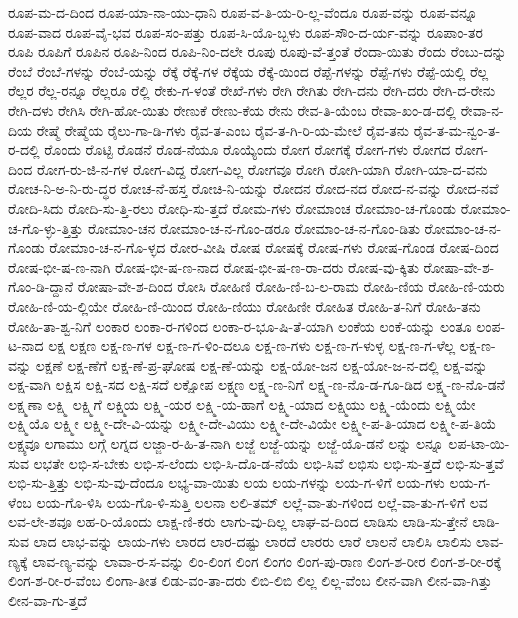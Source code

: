 {ರೂಪ-ಮ-ದ-ದಿಂದ
ರೂಪ-ಯಾ-ನಾ-ಯು-ಧಾನಿ
ರೂಪ-ವ-ತಿ-ಯ-ರಿ-ಲ್ಲ-ವೆಂದೂ
ರೂಪ-ವನ್ನು
ರೂಪ-ವನ್ನೂ
ರೂಪ-ವಾದ
ರೂಪ-ವೈ-ಭವ
ರೂಪ-ಸಂ-ಪತ್ತು
ರೂಪ-ಸಿ-ಯೊ-ಬ್ಬಳು
ರೂಪ-ಸೌಂ-ದ-ರ್ಯ-ವನ್ನು
ರೂಪಾಂ-ತರ
ರೂಪಿ
ರೂಪಿಗೆ
ರೂಪಿನ
ರೂಪಿ-ನಿಂದ
ರೂಪಿ-ನಿಂ-ದಲೇ
ರೂಪು
ರೂಪು-ವೆ-ತ್ತಂತೆ
ರೆಂದಾ-ಯಿತು
ರೆಂದು
ರೆಂಬು-ದನ್ನು
ರೆಂಬೆ
ರೆಂಬೆ-ಗಳನ್ನು
ರೆಂಬೆ-ಯನ್ನು
ರೆಕ್ಕೆ
ರೆಕ್ಕೆ-ಗಳ
ರೆಕ್ಕೆಯ
ರೆಕ್ಕೆ-ಯಿಂದ
ರೆಪ್ಪೆ-ಗಳನ್ನು
ರೆಪ್ಪೆ-ಗಳು
ರೆಪ್ಪೆ-ಯಲ್ಲಿ
ರೆಲ್ಲ
ರೆಲ್ಲರ
ರೆಲ್ಲ-ರನ್ನೂ
ರೆಲ್ಲರೂ
ರೆಲ್ಲಿ
ರೇಕು-ಗ-ಳಂತೆ
ರೇಖೆ-ಗಳು
ರೇಗಿ
ರೇಗಿತು
ರೇಗಿ-ದನು
ರೇಗಿ-ದರು
ರೇಗಿ-ದ-ರೇನು
ರೇಗಿ-ದಳು
ರೇಗಿಸಿ
ರೇಗಿ-ಹೋ-ಯಿತು
ರೇಣುಕೆ
ರೇಣು-ಕೆಯ
ರೇನು
ರೇವ-ತಿ-ಯೆಂಬ
ರೇವಾ-ಖಂ-ಡ-ದಲ್ಲಿ
ರೇವಾ-ನ-ದಿಯ
ರೇಷ್ಮೆ
ರೇಷ್ಮೆಯ
ರೈಲು-ಗಾ-ಡಿ-ಗಳು
ರೈವ-ತ-ಎಂಬ
ರೈವ-ತ-ಗಿ-ರಿ-ಯ-ಮೇಲೆ
ರೈವ-ತನು
ರೈವ-ತ-ಮ-ನ್ವಂ-ತ-ರ-ದಲ್ಲಿ
ರೊಂದು
ರೊಟ್ಟಿ
ರೊಡನೆ
ರೊಡ-ನೆಯೂ
ರೊಯ್ಯೆಂದು
ರೋಗ
ರೋಗಕ್ಕೆ
ರೋಗ-ಗಳು
ರೋಗದ
ರೋಗ-ದಿಂದ
ರೋಗ-ರು-ಜಿ-ನ-ಗಳ
ರೋಗ-ವಿದ್ದ
ರೋಗ-ವಿಲ್ಲ
ರೋಗವೂ
ರೋಗಿ
ರೋಗಿ-ಯಾಗಿ
ರೋಗಿ-ಯಾ-ದ-ವನು
ರೋಚ-ನಿ-ಅ-ನಿ-ರು-ದ್ಧರ
ರೋಚ-ನೆ-ಹಸ್ತ
ರೋಚಿ-ನಿ-ಯನ್ನು
ರೋದನ
ರೋದ-ನದ
ರೋದ-ನ-ವನ್ನು
ರೋದ-ನವೆ
ರೋದಿ-ಸಿದು
ರೋದಿ-ಸು-ತ್ತಿ-ರಲು
ರೋಧಿ-ಸು-ತ್ತದೆ
ರೋಮ-ಗಳು
ರೋಮಾಂಚ
ರೋಮಾಂ-ಚ-ಗೊಂಡು
ರೋಮಾಂ-ಚ-ಗೊ-ಳ್ಳು-ತ್ತಿತ್ತು
ರೋಮಾಂ-ಚನ
ರೋಮಾಂ-ಚ-ನ-ಗೊಂ-ಡರೂ
ರೋಮಾಂ-ಚ-ನ-ಗೊಂ-ಡಿತು
ರೋಮಾಂ-ಚ-ನ-ಗೊಂಡು
ರೋಮಾಂ-ಚ-ನ-ಗೊ-ಳ್ಳದ
ರೋರ-ವೀಷಿ
ರೋಷ
ರೋಷಕ್ಕೆ
ರೋಷ-ಗಳು
ರೋಷ-ಗೊಂಡ
ರೋಷ-ದಿಂದ
ರೋಷ-ಭೀ-ಷ-ಣ-ನಾಗಿ
ರೋಷ-ಭೀ-ಷ-ಣ-ನಾದ
ರೋಷ-ಭೀ-ಷ-ಣ-ರಾ-ದರು
ರೋಷ-ವು-ಕ್ಕಿತು
ರೋಷಾ-ವೇ-ಶ-ಗೊಂ-ಡಿ-ದ್ದಾನೆ
ರೋಷಾ-ವೇ-ಶ-ದಿಂದ
ರೋಸಿ
ರೋಹಿಣಿ
ರೋಹಿ-ಣಿ-ಬ-ಲ-ರಾಮ
ರೋಹಿ-ಣಿಯ
ರೋಹಿ-ಣಿ-ಯರು
ರೋಹಿ-ಣಿ-ಯ-ಲ್ಲಿಯೇ
ರೋಹಿ-ಣಿ-ಯಿಂದ
ರೋಹಿ-ಣಿಯು
ರೋಹಿಣೀ
ರೋಹಿತ
ರೋಹಿ-ತ-ನಿಗೆ
ರೋಹಿ-ತನು
ರೋಹಿ-ತಾ-ಶ್ವ-ನಿಗೆ
ಲಂಕಾರ
ಲಂಕಾ-ರ-ಗಳಿಂದ
ಲಂಕಾ-ರ-ಭೂ-ಷಿ-ತೆ-ಯಾಗಿ
ಲಂಕೆಯ
ಲಂಕೆ-ಯನ್ನು
ಲಂತೂ
ಲಂಪ-ಟ-ನಾದ
ಲಕ್ಷ
ಲಕ್ಷಣ
ಲಕ್ಷ-ಣ-ಗಳ
ಲಕ್ಷ-ಣ-ಗ-ಳಿಂ-ದಲೂ
ಲಕ್ಷ-ಣ-ಗಳು
ಲಕ್ಷ-ಣ-ಗ-ಳುಳ್ಳ
ಲಕ್ಷ-ಣ-ಗ-ಳೆಲ್ಲ
ಲಕ್ಷ-ಣ-ವನ್ನು
ಲಕ್ಷಣೆ
ಲಕ್ಷ-ಣೆಗೆ
ಲಕ್ಷ-ಣೆ-ಪ್ರ-ಘೋಷ
ಲಕ್ಷ-ಣೆ-ಯನ್ನು
ಲಕ್ಷ-ಯೋ-ಜನ
ಲಕ್ಷ-ಯೋ-ಜ-ನ-ದಲ್ಲಿ
ಲಕ್ಷ-ವನ್ನು
ಲಕ್ಷ-ವಾಗಿ
ಲಕ್ಷಿಸ
ಲಕ್ಷಿ-ಸದ
ಲಕ್ಷಿ-ಸದೆ
ಲಕ್ಷೋಪ
ಲಕ್ಷ್ಮಣ
ಲಕ್ಷ್ಮ-ಣ-ನಿಗೆ
ಲಕ್ಷ್ಮ-ಣ-ನೊ-ಡ-ಗೂ-ಡಿದ
ಲಕ್ಷ್ಮ-ಣ-ನೊ-ಡನೆ
ಲಕ್ಷ್ಮಣಾ
ಲಕ್ಷ್ಮಿ
ಲಕ್ಷ್ಮಿಗೆ
ಲಕ್ಷ್ಮಿಯ
ಲಕ್ಷ್ಮಿ-ಯರ
ಲಕ್ಷ್ಮಿ-ಯ-ಹಾಗೆ
ಲಕ್ಷ್ಮಿ-ಯಾದ
ಲಕ್ಷ್ಮಿಯು
ಲಕ್ಷ್ಮಿ-ಯೆಂದು
ಲಕ್ಷ್ಮಿಯೇ
ಲಕ್ಷ್ಮಿಯೊ
ಲಕ್ಷ್ಮೀ
ಲಕ್ಷ್ಮೀ-ದೇ-ವಿ-ಯನ್ನು
ಲಕ್ಷ್ಮೀ-ದೇ-ವಿಯು
ಲಕ್ಷ್ಮೀ-ದೇ-ವಿಯೇ
ಲಕ್ಷ್ಮೀ-ಪ-ತಿ-ಯಾದ
ಲಕ್ಷ್ಮೀ-ಪ-ತಿಯೆ
ಲಕ್ಷ್ಯವೂ
ಲಗಾಮು
ಲಗ್ಗೆ
ಲಗ್ನದ
ಲಜ್ಜಾ-ರ-ಹಿ-ತ-ನಾಗಿ
ಲಜ್ಜೆ
ಲಜ್ಜೆ-ಯನ್ನು
ಲಜ್ಜೆ-ಯೊ-ಡನೆ
ಲನ್ನು
ಲನ್ನೂ
ಲಪ-ಟಾ-ಯಿ-ಸುವ
ಲಭತೇ
ಲಭಿ-ಸ-ಬೇಕು
ಲಭಿ-ಸ-ಲೆಂದು
ಲಭಿ-ಸಿ-ದೊ-ಡ-ನೆಯೆ
ಲಭಿ-ಸಿವೆ
ಲಭಿಸು
ಲಭಿ-ಸು-ತ್ತದೆ
ಲಭಿ-ಸು-ತ್ತವೆ
ಲಭಿ-ಸು-ತ್ತಿತ್ತು
ಲಭಿ-ಸು-ವು-ದೆಂದೂ
ಲಭ್ಯ-ವಾ-ಯಿತು
ಲಯ
ಲಯ-ಗಳನ್ನು
ಲಯ-ಗ-ಳಿಗೆ
ಲಯ-ಗಳು
ಲಯ-ಗ-ಳೆಂಬ
ಲಯ-ಗೊ-ಳಿಸಿ
ಲಯ-ಗೊ-ಳಿ-ಸುತ್ತಿ
ಲಲನಾ
ಲಲಿ-ತಮ್
ಲಲ್ಲೆ-ವಾ-ತು-ಗಳಿಂದ
ಲಲ್ಲೆ-ವಾ-ತು-ಗ-ಳಿಗೆ
ಲವ
ಲವ-ಲೇ-ಶವೂ
ಲಹ-ರಿ-ಯೊಂದು
ಲಾಕ್ಷ-ಣಿ-ಕರು
ಲಾಗು-ವು-ದಿಲ್ಲ
ಲಾಘ-ವ-ದಿಂದ
ಲಾಡಿಸು
ಲಾಡಿ-ಸು-ತ್ತೇನೆ
ಲಾಡಿ-ಸುವ
ಲಾದ
ಲಾಭ-ವನ್ನು
ಲಾಯ-ಗಳು
ಲಾರದ
ಲಾರ-ದಷ್ಟು
ಲಾರದೆ
ಲಾರರು
ಲಾರೆ
ಲಾಲನೆ
ಲಾಲಿಸಿ
ಲಾಲಿಸು
ಲಾವ-ಣ್ಯಕ್ಕೆ
ಲಾವ-ಣ್ಯ-ವನ್ನು
ಲಾವಾ-ರ-ಸ-ವನ್ನು
ಲಿಂ-ಲಿಂಗ
ಲಿಂಗ
ಲಿಂಗಂ
ಲಿಂಗ-ಪು-ರಾಣ
ಲಿಂಗ-ಶ-ರೀರ
ಲಿಂಗ-ಶ-ರೀ-ರಕ್ಕೆ
ಲಿಂಗ-ಶ-ರೀ-ರ-ವೆಂಬ
ಲಿಂಗಾ-ತೀತ
ಲಿಡು-ವಂ-ತಾ-ದರು
ಲಿಬಿ-ಲಿಬಿ
ಲಿಲ್ಲ
ಲಿಲ್ಲ-ವೆಂಬ
ಲೀನ-ವಾಗಿ
ಲೀನ-ವಾ-ಗಿತ್ತು
ಲೀನ-ವಾ-ಗು-ತ್ತದೆ
}
